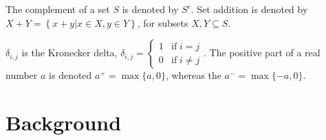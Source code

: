 \documentclass{article}
\begin{document}
The complement of a set $S$ is denoted by $S^c$.   
Set addition is denoted by $X + Y = \left\{x + y | x \in X, y \in Y\right\}$, for subsets $X,Y \subseteq S$.

$\delta_{i,j}$ is the Kronecker delta, $\delta_{i, j} = \begin{cases} 1 & \textrm{if} \; i = j \\ 0 & \textrm{if} \; i \ne j \end{cases}$.
The positive part of a real number $a$ is denoted $a^+ = \max\{a,0\}$, whereas the $a^-=\max\{-a,0\}$.



\section{Background}

\end{document}
